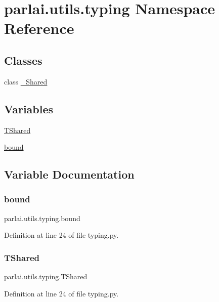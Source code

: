 \hypertarget{namespaceparlai_1_1utils_1_1typing}{}\section{parlai.\+utils.\+typing Namespace Reference}
\label{namespaceparlai_1_1utils_1_1typing}
\subsection*{Classes}
\begin{DoxyCompactItemize}
\item 
class \hyperlink{classparlai_1_1utils_1_1typing_1_1__Shared}{\+\_\+\+Shared}
\end{DoxyCompactItemize}
\subsection*{Variables}
\begin{DoxyCompactItemize}
\item 
\hyperlink{namespaceparlai_1_1utils_1_1typing_a06c547384b848cee5185a9502ccc7ba6}{T\+Shared}
\item 
\hyperlink{namespaceparlai_1_1utils_1_1typing_a653a4f40c80aac724b7913a723e0ca5a}{bound}
\end{DoxyCompactItemize}


\subsection{Variable Documentation}
\mbox{\label{namespaceparlai_1_1utils_1_1typing_a653a4f40c80aac724b7913a723e0ca5a}} 
\subsubsection{\texorpdfstring{bound}{bound}}
{\footnotesize\ttfamily parlai.\+utils.\+typing.\+bound}



Definition at line 24 of file typing.\+py.

\mbox{\label{namespaceparlai_1_1utils_1_1typing_a06c547384b848cee5185a9502ccc7ba6}} 
\subsubsection{\texorpdfstring{T\+Shared}{TShared}}
{\footnotesize\ttfamily parlai.\+utils.\+typing.\+T\+Shared}



Definition at line 24 of file typing.\+py.

